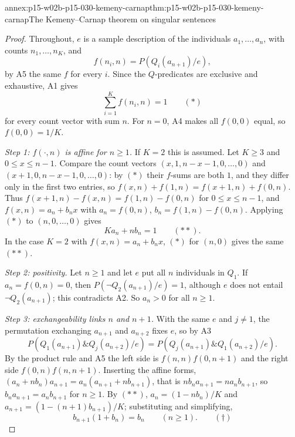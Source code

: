 \begin{annexitem}{annex:p15-w02b-p15-030-kemeny-carnap}{thm:p15-w02b-p15-030-kemeny-carnap}{The Kemeny--Carnap theorem on singular sentences}
\begin{proof}
Throughout, \(e\) is a sample description of the individuals
\(a_1,\ldots,a_n\), with counts \(n_1,\ldots,n_K\), and
\[
 f(n_i,n)=P(Q_i(a_{n+1})/e),
\]
by A5 the same \(f\) for every \(i\). Since the \(Q\)-predicates are exclusive and exhaustive, A1 gives
\begin{equation*}
 \textstyle\sum_{i=1}^Kf(n_i,n)=1\qquad(\ast)
\end{equation*}
for every count vector with sum \(n\). For \(n=0\), A4 makes all
\(f(0,0)\) equal, so \(f(0,0)=1/K\).

\emph{Step 1: \(f(\cdot,n)\) is affine for \(n\geq1\).} If \(K=2\) this is
assumed. Let \(K\geq3\) and \(0\leq x\leq n-1\). Compare the count vectors
\((x,1,n-x-1,0,\ldots,0)\) and \((x+1,0,n-x-1,0,\ldots,0)\): by \((\ast)\)
their \(f\)-sums are both \(1\), and they differ only in the first two
entries, so \(f(x,n)+f(1,n)=f(x+1,n)+f(0,n)\). Thus
\(f(x+1,n)-f(x,n)=f(1,n)-f(0,n)\) for \(0\leq x\leq n-1\), and
\(f(x,n)=a_n+b_nx\) with \(a_n=f(0,n)\), \(b_n=f(1,n)-f(0,n)\). Applying
\((\ast)\) to \((n,0,\ldots,0)\) gives
\begin{equation*}
 Ka_n+nb_n=1\qquad(\ast\ast).
\end{equation*}
In the case \(K=2\) with \(f(x,n)=a_n+b_nx\), \((\ast)\) for \((n,0)\) gives the
same \((\ast\ast)\).

\emph{Step 2: positivity.} Let \(n\geq1\) and let \(e\) put all \(n\)
individuals in \(Q_1\). If \(a_n=f(0,n)=0\), then
\(P(\neg Q_2(a_{n+1})/e)=1\), although \(e\) does not entail
\(\neg Q_2(a_{n+1})\); this contradicts A2. So \(a_n>0\) for all \(n\geq1\).

\emph{Step 3: exchangeability links \(n\) and \(n+1\).} With the same \(e\)
and \(j\neq1\), the permutation exchanging \(a_{n+1}\) and \(a_{n+2}\) fixes
\(e\), so by A3
\[
 P(Q_1(a_{n+1})\&Q_j(a_{n+2})/e)=P(Q_j(a_{n+1})\&Q_1(a_{n+2})/e).
\]
By the
product rule and A5 the left side is \(f(n,n)f(0,n+1)\) and the right side
\(f(0,n)f(n,n+1)\). Inserting the affine forms,
\((a_n+nb_n)a_{n+1}=a_n(a_{n+1}+nb_{n+1})\), that is
\(nb_na_{n+1}=na_nb_{n+1}\), so \(b_na_{n+1}=a_nb_{n+1}\) for \(n\geq1\). By
\((\ast\ast)\), \(a_n=(1-nb_n)/K\) and \(a_{n+1}=(1-(n+1)b_{n+1})/K\);
substituting and simplifying,
\begin{equation*}
 b_{n+1}(1+b_n)=b_n\qquad(n\geq1).\qquad(\dagger)
\end{equation*}


\end{proof}
\end{annexitem}
